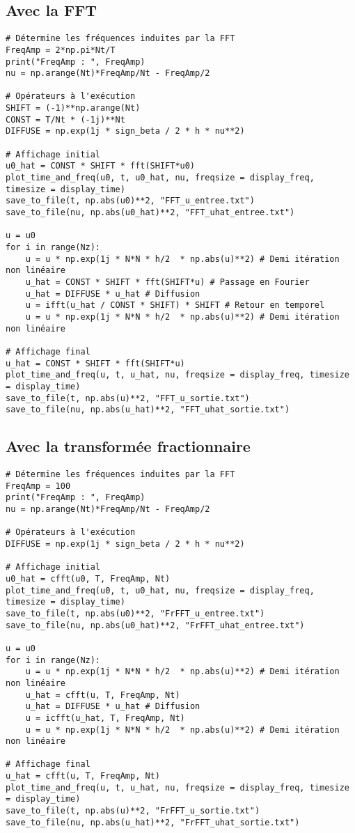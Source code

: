 \documentclass{article}
\begin{document}
\subsection{Avec la FFT}
\begin{verbatim}
# Détermine les fréquences induites par la FFT
FreqAmp = 2*np.pi*Nt/T
print("FreqAmp : ", FreqAmp)
nu = np.arange(Nt)*FreqAmp/Nt - FreqAmp/2

# Opérateurs à l'exécution
SHIFT = (-1)**np.arange(Nt)
CONST = T/Nt * (-1j)**Nt
DIFFUSE = np.exp(1j * sign_beta / 2 * h * nu**2)

# Affichage initial
u0_hat = CONST * SHIFT * fft(SHIFT*u0)
plot_time_and_freq(u0, t, u0_hat, nu, freqsize = display_freq, timesize = display_time)
save_to_file(t, np.abs(u0)**2, "FFT_u_entree.txt")
save_to_file(nu, np.abs(u0_hat)**2, "FFT_uhat_entree.txt")

u = u0
for i in range(Nz):
    u = u * np.exp(1j * N*N * h/2  * np.abs(u)**2) # Demi itération non linéaire
    u_hat = CONST * SHIFT * fft(SHIFT*u) # Passage en Fourier
    u_hat = DIFFUSE * u_hat # Diffusion
    u = ifft(u_hat / CONST * SHIFT) * SHIFT # Retour en temporel
    u = u * np.exp(1j * N*N * h/2  * np.abs(u)**2) # Demi itération non linéaire
    
# Affichage final
u_hat = CONST * SHIFT * fft(SHIFT*u)
plot_time_and_freq(u, t, u_hat, nu, freqsize = display_freq, timesize = display_time)
save_to_file(t, np.abs(u)**2, "FFT_u_sortie.txt")
save_to_file(nu, np.abs(u_hat)**2, "FFT_uhat_sortie.txt")
\end{verbatim}

\subsection{Avec la transformée fractionnaire}
\begin{verbatim}
# Détermine les fréquences induites par la FFT
FreqAmp = 100
print("FreqAmp : ", FreqAmp)
nu = np.arange(Nt)*FreqAmp/Nt - FreqAmp/2

# Opérateurs à l'exécution
DIFFUSE = np.exp(1j * sign_beta / 2 * h * nu**2)

# Affichage initial
u0_hat = cfft(u0, T, FreqAmp, Nt)
plot_time_and_freq(u0, t, u0_hat, nu, freqsize = display_freq, timesize = display_time)
save_to_file(t, np.abs(u0)**2, "FrFFT_u_entree.txt")
save_to_file(nu, np.abs(u0_hat)**2, "FrFFT_uhat_entree.txt")

u = u0
for i in range(Nz):
    u = u * np.exp(1j * N*N * h/2  * np.abs(u)**2) # Demi itération non linéaire
    u_hat = cfft(u, T, FreqAmp, Nt)
    u_hat = DIFFUSE * u_hat # Diffusion
    u = icfft(u_hat, T, FreqAmp, Nt)
    u = u * np.exp(1j * N*N * h/2  * np.abs(u)**2) # Demi itération non linéaire
    
# Affichage final
u_hat = cfft(u, T, FreqAmp, Nt)
plot_time_and_freq(u, t, u_hat, nu, freqsize = display_freq, timesize = display_time)
save_to_file(t, np.abs(u)**2, "FrFFT_u_sortie.txt")
save_to_file(nu, np.abs(u_hat)**2, "FrFFT_uhat_sortie.txt")
\end{verbatim}
\end{document}
